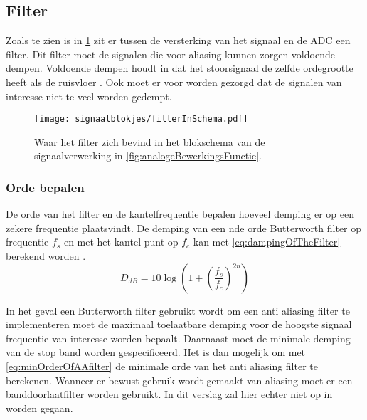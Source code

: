 \subsection{Filter}
Zoals te zien is in \cref{fig:filterInSchema} zit er tussen de versterking van het signaal en de ADC een filter. Dit filter moet de signalen die voor aliasing kunnen zorgen voldoende dempen. Voldoende dempen houdt in dat het stoorsignaal de zelfde ordegrootte heeft als de ruisvloer \cite{energieZuinigeSystemenOntwerpen}. Ook moet er voor worden gezorgd dat de signalen van interesse niet te veel worden gedempt.
\begin{figure}[!htbp]
    \centering
    \texttt{[image: signaalblokjes/filterInSchema.pdf]}
    \caption{Waar het filter zich bevind in het blokschema van de signaalverwerking in \cref{fig:analogeBewerkingsFunctie}.}
    \label{fig:filterInSchema}
\end{figure}

\subsubsection{Orde bepalen} \label{sec:DetermineAAorder}
De orde van het filter en de kantelfrequentie bepalen hoeveel demping er op een zekere frequentie plaatsvindt. De demping van een nde orde Butterworth filter op frequentie $f_s$ en met het kantel punt op $f_c$ kan met \cref{eq:dampingOfTheFilter} berekend worden \cite{electronicFilterDesignHandbook}.
\begin{equation} \label{eq:dampingOfTheFilter}
    D_{dB}=10\log\left(1+\left(\frac{f_s}{f_c}\right)^{2n}\right)
\end{equation}

In het geval een Butterworth filter gebruikt wordt om een anti aliasing filter te implementeren moet de maximaal toelaatbare demping voor de hoogste signaal frequentie van interesse worden bepaalt. Daarnaast moet de minimale demping van de stop band worden gespecificeerd. Het is dan mogelijk om met \cref{eq:minOrderOfAAfilter} de minimale orde van het anti aliasing filter te berekenen.
Wanneer er bewust gebruik wordt gemaakt van aliasing moet er een banddoorlaatfilter worden gebruikt. In dit verslag zal hier echter niet op in worden gegaan.

